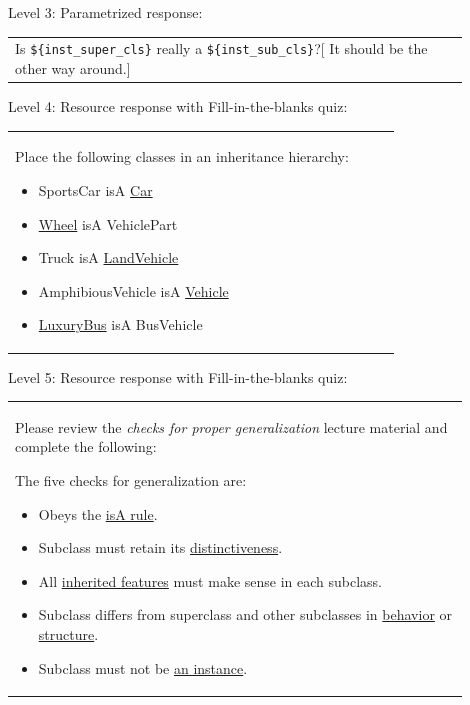 \noindent Level 3: Parametrized response: \medskip

\begin{tabular}{|p{0.9\linewidth}}
Is \verb|${inst_super_cls}| really a \verb|${inst_sub_cls}|?[ It should be the other way around.]
\end{tabular} \medskip

\noindent Level 4: Resource response with Fill-in-the-blanks quiz: \medskip

\begin{tabular}{|p{0.9\linewidth}}

Place the following classes in an inheritance hierarchy:

\begin{itemize}
    \item SportsCar isA \underline{Car}
    \item \underline{Wheel} isA VehiclePart
    \item Truck isA \underline{LandVehicle}
    \item AmphibiousVehicle isA \underline{Vehicle}
    \item \underline{LuxuryBus} isA BusVehicle
\end{itemize}

\end{tabular} \medskip

\noindent Level 5: Resource response with Fill-in-the-blanks quiz: \medskip

\begin{tabular}{|p{0.9\linewidth}}

Please review the \textit{checks for proper generalization} lecture material
and complete the following:

The five checks for generalization are:

\begin{itemize}
    \item Obeys the \underline{isA rule}.
    \item Subclass must retain its \underline{distinctiveness}.
    \item All \underline{inherited features} must make sense in each subclass.
    \item Subclass differs from superclass and other subclasses in \underline{behavior} or \underline{structure}.
    \item Subclass must not be \underline{an instance}.
\end{itemize}

\end{tabular} \medskip

